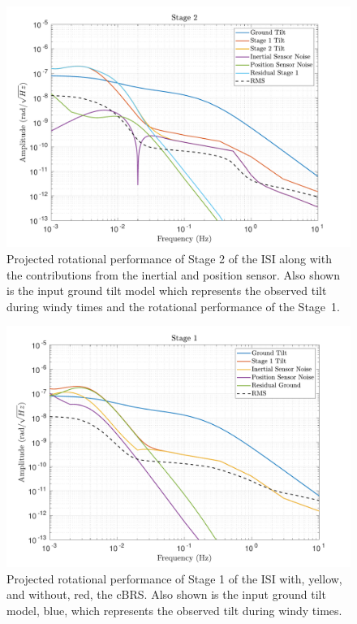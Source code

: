 \documentclass [12pt, proquest]{uwthesis}[2019]
\begin{document}
\begin{figure}[!h]
\begin{center}
\includegraphics[width=\textwidth]{cBRS_Model_ST2RX.pdf}
\caption[Projected rotational performance of Stage 2 of the ISI]{Projected rotational performance of Stage 2 of the ISI along with the contributions from the inertial and position sensor. Also shown is the input ground tilt model which represents the observed tilt during windy times and the rotational performance of the Stage~1.}
\label{cBRS2R}
\end{center}
\end{figure}

\begin{figure}[!h]
\begin{center}
\includegraphics[width=\textwidth]{cBRS_Model_ST1RX.pdf}
\caption[Projected rotational performance of Stage 1 of the ISI]{Projected rotational performance of Stage 1 of the ISI with, yellow, and without, red, the cBRS. Also shown is the input ground tilt model, blue, which represents the observed tilt during windy times.}
\label{cBRS1R}
\end{center}
\end{figure}
\end{document}
